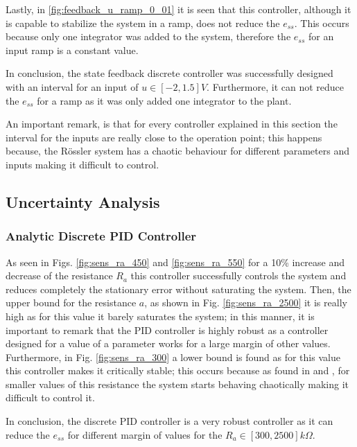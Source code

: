 Lastly, in \ref{fig:feedback_u_ramp_0_01} it is seen that this controller, although it is capable to stabilize the system in a ramp, does not reduce the $e_{ss}$. This occurs because only one integrator was added to the system, therefore the $e_{ss}$ for an input ramp is a constant value. 

In conclusion, the state feedback discrete controller was successfully designed with an interval for an input of $u \in [-2, 1.5]V$. Furthermore, it can not reduce the $e_{ss}$ for a ramp as it was only added one integrator to the plant.

An important remark, is that for every controller explained in this section the interval for the inputs are really close to the operation point; this happens because, the Rössler system has a chaotic behaviour for different parameters and inputs making it difficult to control.

\subsection{Uncertainty Analysis}
\subsubsection{Analytic Discrete PID Controller}
As seen in Figs. \ref{fig:sens_ra_450} and \ref{fig:sens_ra_550} for a 10\% increase and decrease of the resistance $R_a$ this controller successfully controls the system and reduces completely the stationary error without saturating the system. Then, the upper bound for the resistance $a$, as shown in Fig. \ref{fig:sens_ra_2500} it is really high as for this value it barely saturates the system; in this manner, it is important to remark that the PID controller is highly robust as a controller designed for a value of a parameter works for a large margin of other values. Furthermore, in Fig. \ref{fig:sens_ra_300} a lower bound is found as for this value this controller makes it critically stable; this occurs because as found in \cite{JS_PL1} and \cite{JS_PL2}, for smaller values of this resistance the system starts behaving chaotically making it difficult to control it.

In conclusion, the discrete PID controller is a very robust controller as it can reduce the $e_{ss}$ for different margin of values for the $R_a \in [300, 2500] k\Omega$. 

